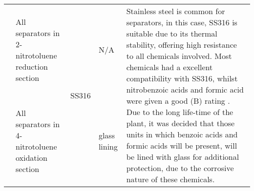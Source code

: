 {\begin{tabular}{@{}lp{5cm}p{2cm}p{2cm}p{12cm}@{}}
                                                      & All separators in 2-nitrotoluene reduction section      & \multirow[t]{4}{=}{SS316}                                                                 & N/A                                               & \multirow[t]{4}{=}{Stainless steel is common for separators, in this case, SS316 is suitable due to its thermal stability, offering high resistance to all chemicals involved. Most chemicals had a excellent compatibility with SS316, whilst nitrobenzoic acids and formic acid were given a good (B) rating \cite{cp_lab_safety_stainless_nodate}. Due to the long life-time of the plant, it was decided that those units in which benzoic acids and formic acids will be present, will be lined with glass for additional protection, due to the corrosive nature of these chemicals.}                                                                                                                                                                                                                                                                                                                                                                \\ \cmidrule(l){2-2} \cmidrule(l){4-4}
                                                      & All separators in 4-nitrotoluene oxidation section      &                                                                                        & \multirow[t]{3}{=}{glass lining}                     &                                                                                                                                                                                                                                                                                                                                                                                                                                                                                                                                                                                                                                                                                                                                                                                                                                                                                                                    \\ \cmidrule(l){2-2}

\end{tabular}}
